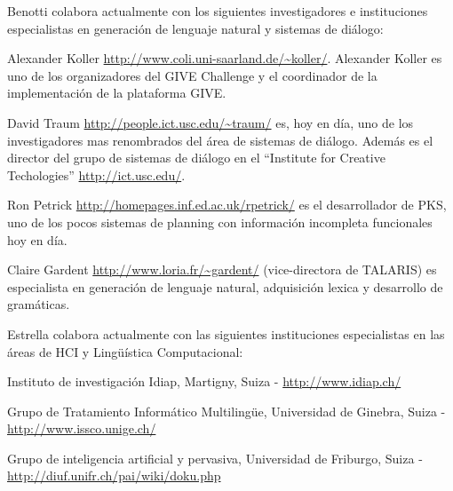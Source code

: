 Benotti colabora actualmente con los siguientes investigadores e instituciones
especialistas en generaci\'on de lenguaje natural y sistemas de di\'alogo:

\begin{myitemize}
\item Alexander Koller \url{http://www.coli.uni-saarland.de/~koller/}.
Alexander Koller es uno de los organizadores del GIVE Challenge y el
coordinador de la implementaci\'on de la plataforma GIVE.

\item David Traum \url{http://people.ict.usc.edu/~traum/} es, hoy en d\'ia, uno
de los investigadores mas renombrados del \'area de sistemas de di\'alogo.
Adem\'as es el director del grupo de sistemas de di\'alogo en el ``Institute
for Creative Techologies'' \url{http://ict.usc.edu/}.

\item Ron Petrick \url{http://homepages.inf.ed.ac.uk/rpetrick/} es el
desarrollador de PKS, uno de los pocos sistemas de planning con informaci\'on
incompleta funcionales hoy en d\'ia.

\item Claire Gardent \url{http://www.loria.fr/~gardent/} (vice-directora de
TALARIS) es especialista en generaci\'on de lenguaje natural, adquisici\'on
lexica y desarrollo de gram\'aticas.
\end{myitemize}

Estrella colabora actualmente con las siguientes instituciones especialistas en las \'areas de HCI y  Ling\"u\'istica Computacional:
\begin{myitemize}
    \item  Instituto de investigaci\'on Idiap, Martigny, Suiza -  \url{http://www.idiap.ch/}
\item Grupo de Tratamiento Inform\'atico Multiling\"ue, Universidad de Ginebra, Suiza - \url{http://www.issco.unige.ch/}
\item Grupo de inteligencia artificial y pervasiva, Universidad de Friburgo, Suiza - \url{http://diuf.unifr.ch/pai/wiki/doku.php}
\end{myitemize}

